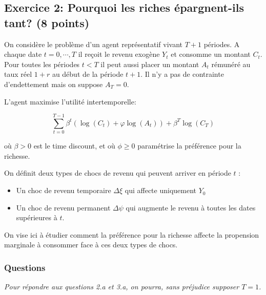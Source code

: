 \documentclass[a4paper,12pt]{article}
\begin{document}
\subsection*{Exercice 2: Pourquoi les riches épargnent-ils tant? (8 points)}

On considère le problème d'un agent représentatif vivant $T+1$ périodes. A chaque date $t=0,\cdots,T$ il
reçoit le revenu exogène $Y_t$ et consomme un montant $C_t$.
Pour toutes les périodes $t<T$ il peut aussi placer un montant $A_t$ rémunéré au 
taux réel $1+r$ au début de la période $t+1$. Il n'y a pas de contrainte d'endettement mais on suppose $A_T=0$.

L'agent maximise l'utilité intertemporelle: 

\begin{equation}
\sum_{t=0}^{T-1} \beta^t \left( \log(C_t) + \varphi \log(A_t) \right) + \beta^T \log(C_T)\label{objectif}
\end{equation}

où $\beta>0$ est le time discount, et où $\phi\geq0$ paramétrise la préférence pour la richesse.


On définit deux types de chocs de revenu qui peuvent arriver en période $t$ :

\begin{itemize}
\item Un choc de revenu temporaire $\Delta \xi$ qui affecte uniquement $Y_0$
\item Un choc de revenu permanent $\Delta \psi$ qui augmente le revenu à toutes les dates supérieures à $t$.
\end{itemize}

On vise ici à étudier comment la préférence pour la richesse affecte la propension marginale à consommer face à ces deux types de chocs.


\newpage

\subsubsection*{Questions}

\emph{Pour répondre aux questions 2.a et 3.a, on pourra, sans préjudice supposer $T=1$.}
\end{document}
